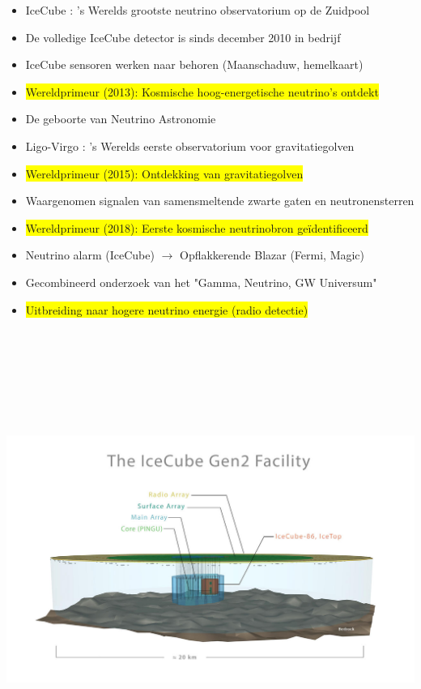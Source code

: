 \onecolumn
\begin{itemize}
\item {\blue IceCube : 's Werelds grootste neutrino observatorium op de Zuidpool}
\item[] De volledige IceCube detector is sinds december 2010 in bedrijf
\item[] IceCube sensoren werken naar behoren (Maanschaduw, hemelkaart)
\item \colorbox{yellow}{Wereldprimeur (2013): Kosmische hoog-energetische neutrino's ontdekt}
\item[] \begin{center}{\red De geboorte van Neutrino Astronomie}\end{center}
\item {\blue Ligo-Virgo : 's Werelds eerste observatorium voor gravitatiegolven}
\item[] \colorbox{yellow}{Wereldprimeur (2015): Ontdekking van gravitatiegolven}
\item[] Waargenomen signalen van samensmeltende zwarte gaten en neutronensterren
\item \colorbox{yellow}{Wereldprimeur (2018): Eerste kosmische neutrinobron ge\"{i}dentificeerd}
\item[] Neutrino alarm (IceCube) $\rightarrow$ Opflakkerende Blazar (Fermi, Magic)
\item[] {\blue Gecombineerd onderzoek van het "Gamma, Neutrino, GW Universum"}
\item \colorbox{yellow}{Uitbreiding naar hogere neutrino energie (radio detectie)}
\end{itemize}
%
\begin{center}
{\red {}}
\end{center}

\Tr
\onecolumn
\begin{center}
\includegraphics[keepaspectratio,height=15cm]{icecube-gen2}
\end{center}
